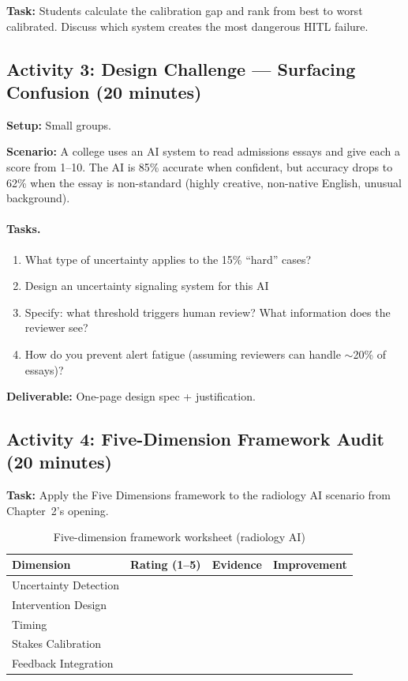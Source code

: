\textbf{Task:} Students calculate the calibration gap and rank from best to worst calibrated. Discuss which system creates the most dangerous HITL failure.

\subsection{Activity 3: Design Challenge --- Surfacing Confusion (20 minutes)}

\textbf{Setup:} Small groups.

\textbf{Scenario:} A college uses an AI system to read admissions essays and give each a score from 1--10. The AI is 85\% accurate when confident, but accuracy drops to 62\% when the essay is non-standard (highly creative, non-native English, unusual background).

\paragraph{Tasks.}
\begin{enumerate}
    \item What type of uncertainty applies to the 15\% ``hard'' cases?
    \item Design an uncertainty signaling system for this AI
    \item Specify: what threshold triggers human review? What information does the reviewer see?
    \item How do you prevent alert fatigue (assuming reviewers can handle $\sim$20\% of essays)?
\end{enumerate}

\textbf{Deliverable:} One-page design spec + justification.

\subsection{Activity 4: Five-Dimension Framework Audit (20 minutes)}

\textbf{Task:} Apply the Five Dimensions framework to the radiology AI scenario from Chapter~2's opening.

\begin{table}[htbp]
\caption{Five-dimension framework worksheet (radiology AI)}
\label{tab:radiology-audit}
\centering
\begin{tabular}{@{}p{3.5cm}p{2cm}p{3.5cm}p{3.5cm}@{}}
\toprule
\textbf{Dimension} & \textbf{Rating (1--5)} & \textbf{Evidence} & \textbf{Improvement} \\
\midrule
Uncertainty Detection & & & \\[8pt]
Intervention Design & & & \\[8pt]
Timing & & & \\[8pt]
Stakes Calibration & & & \\[8pt]
Feedback Integration & & & \\
\bottomrule
\end{tabular}
\end{table}

